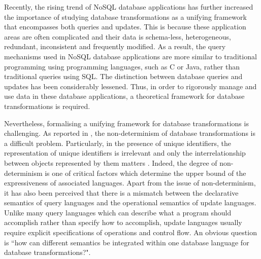 \documentclass[preprint,11pt]{elsarticle}
\theoremstyle{definition}
\theoremstyle{remark}
\begin{document}
Recently, the rising trend of NoSQL database applications has further increased the importance of studying database transformations as a unifying framework that encompasses both queries and updates. This is because
these application areas are often complicated and
their data is schema-less, heterogeneous, redundant,
inconsistent and frequently modified. As a result, the query mechanisms used in NoSQL database applications are more similar to traditional programming using programming languages, such as C or Java, rather than traditional queries using SQL. The distinction between database queries and updates has been considerably lessened. Thus, in order to rigorously manage and use data in these database applications, a theoretical framework for database transformations is required.

Nevertheless, formalising a unifying framework
  for database transformations is challenging. As reported in
  \cite{VandenBusscheNondeterministic}, the non-determinism of
  database transformations is a difficult problem. Particularly, in the presence of unique identifiers, the representation of unique
identifiers is irrelevant and only the interrelationship between
objects represented by them matters \cite{AbiteboulIQL89}. Indeed, the degree of
non-determinism is one of critical factors which determine the upper bound of the
expressiveness of associated languages. Apart from the issue of non-determinism,
it has also been perceived that there is a mismatch between the
declarative semantics of query languages and the operational
semantics of update languages. Unlike many query languages which can
describe what a program should accomplish rather than specify how to
accomplish, update languages usually require explicit specifications
of operations and control flow. An obvious question is ``how can different semantics be integrated within one
database language for database transformations?".
\end{document}
